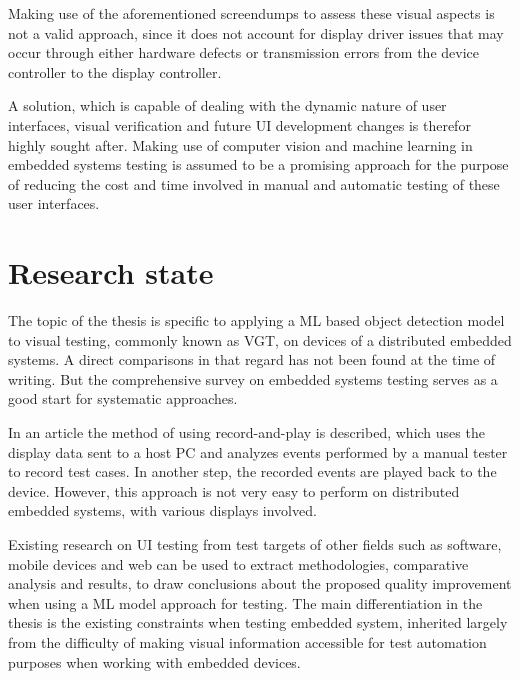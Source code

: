 \documentclass[Proposal,BIC,english,IEEE]{BASE/twbook} %
\begin{document}
Making use of the aforementioned screendumps to assess these visual aspects is not a valid approach, since it does not account for display driver issues that may occur through either hardware defects or transmission errors from the device controller to the display controller.

A solution, which is capable of dealing with the dynamic nature of user interfaces, visual verification and future UI development changes is therefor highly sought after. Making use of computer vision and machine learning in embedded systems testing is assumed to be a promising approach for the purpose of reducing the cost and time involved in manual and automatic testing of these user interfaces.
\chapter{Research state}
The topic of the thesis is specific to applying a ML based object detection model to visual testing, commonly known as VGT, on devices of a distributed embedded systems. A direct comparisons in that regard has not been found at the time of writing. But the comprehensive survey on embedded systems testing \autocite{garousiTestingEmbeddedSoftware2018} serves as a good start for systematic approaches.

In an article \autocite{linImprovingAccuracyAutomated2014} the method of using record-and-play is described, which uses the display data sent to a host PC and analyzes events performed by a manual tester to record test cases. In another step, the recorded events are played back to the device. However, this approach is not very easy to perform on distributed embedded systems, with various displays involved.

Existing research on UI testing from test targets of other fields such as software, mobile devices and web can be used to extract methodologies, comparative analysis and results, to draw conclusions about the proposed quality improvement when using a ML model approach for testing. The main differentiation in the thesis is the existing constraints when testing embedded system, inherited largely from the difficulty of making visual information accessible for test automation purposes when working with embedded devices.
\end{document}
